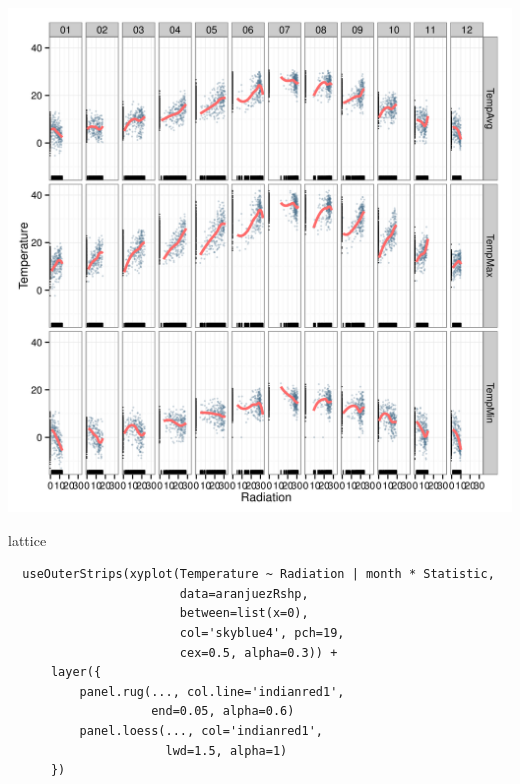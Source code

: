 \documentclass[xcolor={usenames,svgnames,dvipsnames}]{beamer}
\begin{document}
\begin{frame}[label=sec-4-2-2]{}
\includegraphics[width=.9\linewidth]{figs/aranjuezFacetGrid.png}
\end{frame}


\begin{frame}[fragile,label=sec-4-2-3]{lattice}
 \lstset{language=R,label= ,caption= ,numbers=none}
\begin{lstlisting}
  useOuterStrips(xyplot(Temperature ~ Radiation | month * Statistic,
                        data=aranjuezRshp,
                        between=list(x=0),
                        col='skyblue4', pch=19,
                        cex=0.5, alpha=0.3)) +
      layer({
          panel.rug(..., col.line='indianred1',
                    end=0.05, alpha=0.6)
          panel.loess(..., col='indianred1',
                      lwd=1.5, alpha=1)
      })
\end{lstlisting}
\end{frame}
\end{document}
